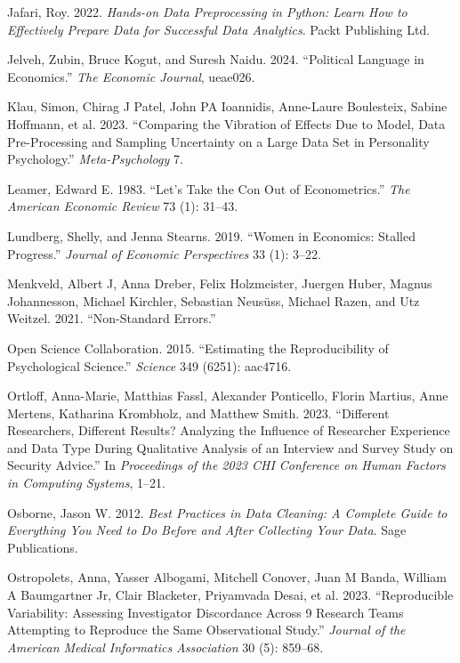 \documentclass[
  letterpaper,
  DIV=11,
  numbers=noendperiod]{scrartcl}
\newlength{\cslhangindent}
\newenvironment{CSLReferences}[2] %
 {\begin{list}{}{%
  \setlength{\itemindent}{0pt}
  \setlength{\leftmargin}{0pt}
  \setlength{\parsep}{0pt}
  \ifodd #1
   \setlength{\leftmargin}{\cslhangindent}
   \setlength{\itemindent}{-1\cslhangindent}
  \fi
  \setlength{\itemsep}{#2\baselineskip}}}
 {\end{list}}
\begin{document}
\begin{CSLReferences}{1}{0}
Jafari, Roy. 2022. \emph{Hands-on Data Preprocessing in Python: Learn
How to Effectively Prepare Data for Successful Data Analytics}. Packt
Publishing Ltd.

Jelveh, Zubin, Bruce Kogut, and Suresh Naidu. 2024. {``Political
Language in Economics.''} \emph{The Economic Journal}, ueae026.

Klau, Simon, Chirag J Patel, John PA Ioannidis, Anne-Laure Boulesteix,
Sabine Hoffmann, et al. 2023. {``Comparing the Vibration of Effects Due
to Model, Data Pre-Processing and Sampling Uncertainty on a Large Data
Set in Personality Psychology.''} \emph{Meta-Psychology} 7.

Leamer, Edward E. 1983. {``Let's Take the Con Out of Econometrics.''}
\emph{The American Economic Review} 73 (1): 31--43.

Lundberg, Shelly, and Jenna Stearns. 2019. {``Women in Economics:
Stalled Progress.''} \emph{Journal of Economic Perspectives} 33 (1):
3--22.

Menkveld, Albert J, Anna Dreber, Felix Holzmeister, Juergen Huber,
Magnus Johannesson, Michael Kirchler, Sebastian Neusüss, Michael Razen,
and Utz Weitzel. 2021. {``Non-Standard Errors.''}

Open Science Collaboration. 2015. {``Estimating the Reproducibility of
Psychological Science.''} \emph{Science} 349 (6251): aac4716.

Ortloff, Anna-Marie, Matthias Fassl, Alexander Ponticello, Florin
Martius, Anne Mertens, Katharina Krombholz, and Matthew Smith. 2023.
{``Different Researchers, Different Results? Analyzing the Influence of
Researcher Experience and Data Type During Qualitative Analysis of an
Interview and Survey Study on Security Advice.''} In \emph{Proceedings
of the 2023 CHI Conference on Human Factors in Computing Systems},
1--21.

Osborne, Jason W. 2012. \emph{Best Practices in Data Cleaning: A
Complete Guide to Everything You Need to Do Before and After Collecting
Your Data}. Sage Publications.

Ostropolets, Anna, Yasser Albogami, Mitchell Conover, Juan M Banda,
William A Baumgartner Jr, Clair Blacketer, Priyamvada Desai, et al.
2023. {``Reproducible Variability: Assessing Investigator Discordance
Across 9 Research Teams Attempting to Reproduce the Same Observational
Study.''} \emph{Journal of the American Medical Informatics Association}
30 (5): 859--68.


\end{CSLReferences}
\end{document}
